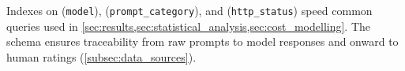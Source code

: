 Indexes on (\texttt{model}), (\texttt{prompt\_category}), and (\texttt{http\_status}) speed common queries used in \cref{sec:results,sec:statistical_analysis,sec:cost_modelling}. The schema ensures traceability from raw prompts to model responses and onward to human ratings (\cref{subsec:data_sources}).

